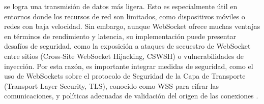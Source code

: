             se logra una transmisi\'on de datos m\'as ligera. Esto es especialmente \'util en entornos donde los recursos de red 
            son limitados, como dispositivos m\'oviles o redes con baja velocidad. \cite{WebSocketEfficiency}
    \vskip 0.5cm
        Sin embargo, aunque WebSocket ofrece muchas ventajas en t\'erminos de rendimiento y latencia, 
            su implementaci\'on puede presentar desaf\'ios de seguridad, como la exposici\'on a ataques 
            de secuestro de WebSocket entre sitios (Cross-Site WebSocket Hijacking, CSWSH) o 
            vulnerabilidades de inyecci\'on. Por esta raz\'on, es importante integrar medidas de seguridad, 
            como el uso de WebSockets sobre el protocolo de Seguridad de la Capa de Transporte 
            (Transport Layer Security, TLS), conocido como WSS para cifrar las comunicaciones, 
            y pol\'iticas adecuadas de validaci\'on del origen de las conexiones \cite{WebSocketSecurity}.
    